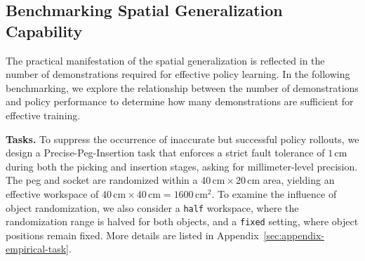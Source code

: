 


\subsection{Benchmarking Spatial Generalization Capability}

The practical manifestation of the spatial generalization is reflected in the number of demonstrations required for effective policy learning. In the following benchmarking, we explore the relationship between the number of demonstrations and policy performance to determine how many demonstrations are sufficient for effective training.

\vspace{0.2cm} \noindent\textbf{Tasks.} 
To suppress the occurrence of inaccurate but successful policy rollouts, we design a Precise-Peg-Insertion task that enforces a strict fault tolerance of $1\,\mathrm{cm}$ during both the picking and insertion stages, asking for millimeter-level precision. The peg and socket are randomized within a $40\,\mathrm{cm} \times 20\,\mathrm{cm}$ area, yielding an effective workspace of $40\,\mathrm{cm} \times 40\,\mathrm{cm} = 1600\,\mathrm{cm}^2$. To examine the influence of object randomization, we also consider a \texttt{half} workspace, where the randomization range is halved for both objects, and a \texttt{fixed} setting, where object positions remain fixed. More details are listed in Appendix~\ref{sec:appendix-empirical-task}.

